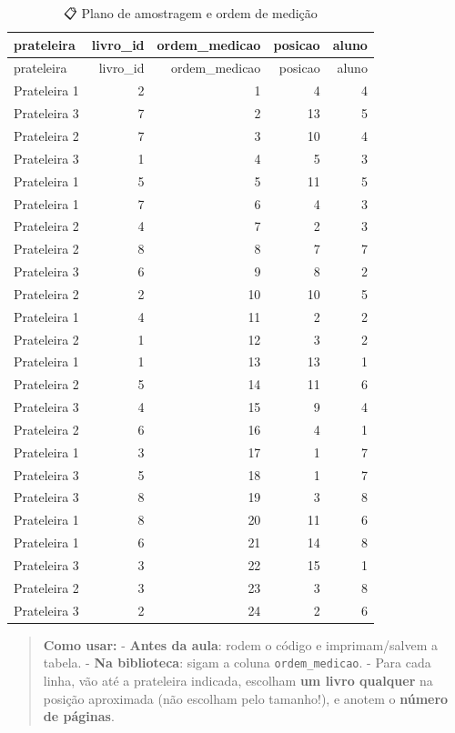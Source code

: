 \documentclass[
]{article}
\begin{document}
\begin{longtable}[]{@{}lrrrr@{}}
\caption{📋 Plano de amostragem e ordem de medição}\tabularnewline
\toprule\noalign{}
prateleira & livro\_id & ordem\_medicao & posicao & aluno \\
\midrule\noalign{}
\endfirsthead
\toprule\noalign{}
prateleira & livro\_id & ordem\_medicao & posicao & aluno \\
\midrule\noalign{}
\endhead
\bottomrule\noalign{}
\endlastfoot
Prateleira 1 & 2 & 1 & 4 & 4 \\
Prateleira 3 & 7 & 2 & 13 & 5 \\
Prateleira 2 & 7 & 3 & 10 & 4 \\
Prateleira 3 & 1 & 4 & 5 & 3 \\
Prateleira 1 & 5 & 5 & 11 & 5 \\
Prateleira 1 & 7 & 6 & 4 & 3 \\
Prateleira 2 & 4 & 7 & 2 & 3 \\
Prateleira 2 & 8 & 8 & 7 & 7 \\
Prateleira 3 & 6 & 9 & 8 & 2 \\
Prateleira 2 & 2 & 10 & 10 & 5 \\
Prateleira 1 & 4 & 11 & 2 & 2 \\
Prateleira 2 & 1 & 12 & 3 & 2 \\
Prateleira 1 & 1 & 13 & 13 & 1 \\
Prateleira 2 & 5 & 14 & 11 & 6 \\
Prateleira 3 & 4 & 15 & 9 & 4 \\
Prateleira 2 & 6 & 16 & 4 & 1 \\
Prateleira 1 & 3 & 17 & 1 & 7 \\
Prateleira 3 & 5 & 18 & 1 & 7 \\
Prateleira 3 & 8 & 19 & 3 & 8 \\
Prateleira 1 & 8 & 20 & 11 & 6 \\
Prateleira 1 & 6 & 21 & 14 & 8 \\
Prateleira 3 & 3 & 22 & 15 & 1 \\
Prateleira 2 & 3 & 23 & 3 & 8 \\
Prateleira 3 & 2 & 24 & 2 & 6 \\
\end{longtable}

\begin{quote}
\textbf{Como usar:} - \textbf{Antes da aula}: rodem o código e
imprimam/salvem a tabela. - \textbf{Na biblioteca}: sigam a coluna
\texttt{ordem\_medicao}. - Para cada linha, vão até a prateleira
indicada, escolham \textbf{um livro qualquer} na posição aproximada (não
escolham pelo tamanho!), e anotem o \textbf{número de páginas}.
\end{quote}
\end{document}

